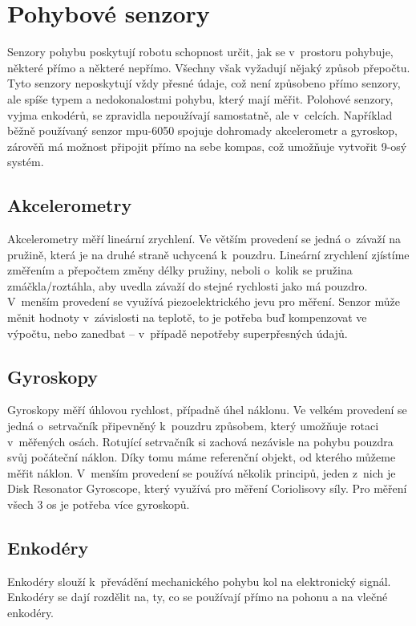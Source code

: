 \section{Pohybové senzory} 
Senzory pohybu poskytují robotu schopnost určit, jak se v~prostoru pohybuje, některé přímo a některé nepřímo.
Všechny však vyžadují nějaký způsob přepočtu.
Tyto senzory neposkytují vždy přesné údaje, což není způsobeno přímo senzory, ale spíše typem a nedokonalostmi pohybu, který mají měřit.
Polohové senzory, vyjma enkodérů, se zpravidla nepoužívají samostatně, ale v~celcích.
Například běžně používaný senzor mpu-6050\cite{mpu6050} spojuje dohromady akcelerometr a gyroskop, zárověň má možnost připojit přímo na sebe kompas, což umožňuje vytvořit 9-osý systém.


\subsection{Akcelerometry}
Akcelerometry měří lineární zrychlení.
Ve větším provedení se jedná o~závaží na pružině, která je na druhé straně uchycená k~pouzdru. 
Lineární zrychlení zjístíme změřením a přepočtem změny délky pružiny, neboli o~kolik se pružina zmáčkla/roztáhla, aby uvedla závaží do stejné rychlosti jako má pouzdro.
V~menším provedení se využívá piezoelektrického jevu pro měření.
Senzor může měnit hodnoty v~závislosti na teplotě, to je potřeba buď kompenzovat ve výpočtu, nebo zanedbat -- v~případě nepotřeby superpřesných údajů\cite{accel}.

\subsection{Gyroskopy}
Gyroskopy měří úhlovou rychlost, případně úhel náklonu.
Ve velkém provedení se jedná o~setrvačník připevněný k~pouzdru způsobem, který umožňuje rotaci v~měřených osách.
Rotující setrvačník si zachová nezávisle na pohybu pouzdra svůj počáteční náklon.
Díky tomu máme referenční objekt, od kterého můžeme měřit náklon.
V~menším provedení se používá několik principů, jeden z~nich je Disk Resonator Gyroscope, který využívá pro měření Coriolisovy síly.
Pro měření všech 3 os je potřeba více gyroskopů.
\cite{gyro}
\cite{gyro-2}

\subsection{Enkodéry}
Enkodéry slouží k~převádění mechanického pohybu kol na elektronický signál.
Enkodéry se dají rozdělit na, ty, co se používají přímo na pohonu a na vlečné enkodéry.

